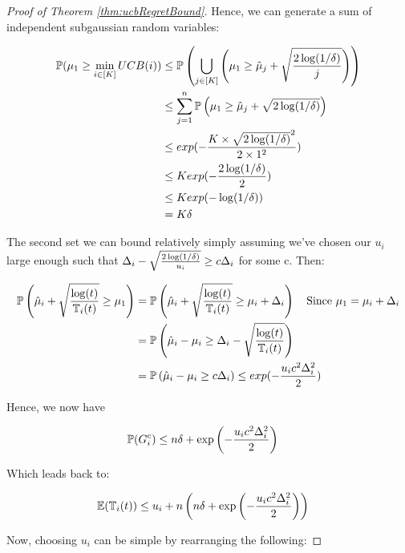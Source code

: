 \begin{proof}[Proof of Theorem \ref{thm:ucbRegretBound}]
Hence, we can generate a sum of independent subgaussian random variables:

\begin{align*}
\mathbb{P}(\mu_1 \geq \min_{i \in [K]} UCB(i))
&\leq \mathbb{P} \left(\bigcup_{j \in [K]} \left( \mu_1 \geq \hat{\mu}_j + \sqrt{\frac{2\log(1/\delta)}{j}} \right) \right) \\
&\leq \sum_{j=1}^{n} \mathbb{P} \left( \mu_1 \geq \hat{\mu}_j + \sqrt{2\log(1/\delta)} \right) \\
&\leq exp(-\frac{K \times \sqrt{2\log(1/\delta)}^2}{2 \times 1^2}) \\
&\leq K exp(-\frac{2\log(1/\delta)}{2}) \\
&\leq K exp(-\log(1/\delta)) \\
&= K \delta
\end{align*}

The second set we can bound relatively simply assuming we've chosen our $u_i$ large enough such that $\Delta_{i} - \sqrt{\frac{2\log(1/\delta)}{u_i}} \geq c \Delta_{i}$ for some c. Then:

\begin{align*}
\mathbb{P}\left( \hat{\mu}_i + \sqrt{\frac{\log(t)}{\mathbb{T}_{i}(t)}} \geq \mu_1 \right)
&= \mathbb{P}\left( \hat{\mu}_i + \sqrt{\frac{\log(t)}{\mathbb{T}_{i}(t)}} \geq \mu_{i} + \Delta_{i} \right) \quad \text{Since $\mu_1 = \mu_{i} + \Delta_{i}$} \\
&= \mathbb{P}\left( \hat{\mu}_i - \mu_{i} \geq \Delta_{i} - \sqrt{\frac{\log(t)}{\mathbb{T}_{i}(t)}} \right) \\
&= \mathbb{P}\left( \hat{\mu}_i - \mu_{i} \geq c \Delta_{i} \right)
\leq exp(-\frac{u_i c^2 \Delta_{i}^2}{2})
\end{align*}

Hence, we now have

\begin{align*}
\mathbb{P}(G_i^c) &\leq n \delta + \exp\left(-\frac{u_i c^2 \Delta_{i}^2}{2}\right)
\end{align*}

Which leads back to:

\begin{align*}
\mathbb{E}(\mathbb{T}_{i}(t)) &\leq u_i + n \left(n \delta + \exp\left(-\frac{u_i c^2 \Delta_{i}^2}{2}\right)\right)
\end{align*}

Now, choosing $u_i$ can be simple by rearranging the following:


\end{proof}
